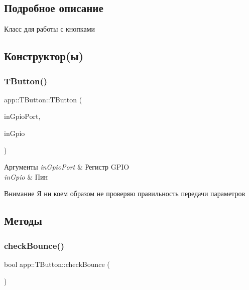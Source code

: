 \subsection{Подробное описание}
Класс для работы с кнопками 

\subsection{Конструктор(ы)}
\mbox{\label{classapp_1_1_t_button_a846432bef1a2f5f2705eef5f95d22ae2}} 
\subsubsection{\texorpdfstring{T\+Button()}{TButton()}}
{\footnotesize\ttfamily app\+::\+T\+Button\+::\+T\+Button (\begin{DoxyParamCaption}\item[{G\+P\+I\+O\+\_\+\+Type\+Def $\ast$}]{in\+Gpio\+Port,  }\item[{uint16\+\_\+t}]{in\+Gpio }\end{DoxyParamCaption})}


\begin{DoxyParams}{Аргументы}
{\em in\+Gpio\+Port} & Регистр G\+P\+IO \\
\hline
{\em in\+Gpio} & Пин \\
\hline
\end{DoxyParams}
\begin{DoxyAttention}{Внимание}
Я ни коем образом не проверяю правильность передачи параметров 
\end{DoxyAttention}


\subsection{Методы}
\mbox{\label{classapp_1_1_t_button_a52714fba93672ac5690de6f9d56e9a5f}} 
\subsubsection{\texorpdfstring{check\+Bounce()}{checkBounce()}}
{\footnotesize\ttfamily bool app\+::\+T\+Button\+::check\+Bounce (\begin{DoxyParamCaption}{ }\end{DoxyParamCaption})}



